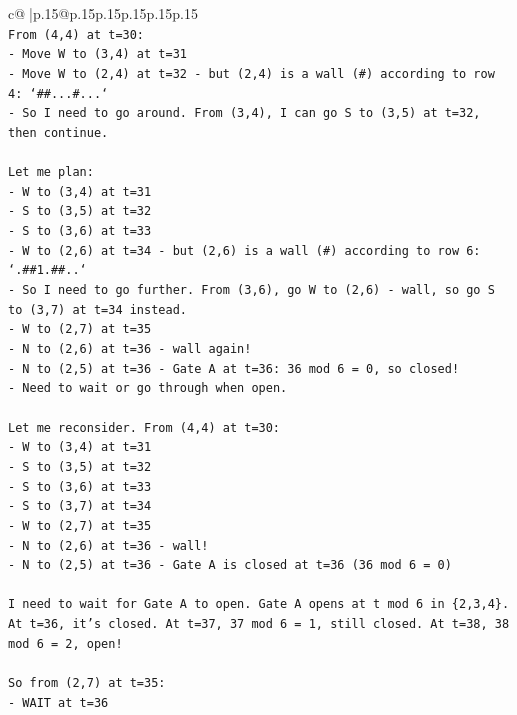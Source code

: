 \documentclass{article}
\begin{document}
{\begin{supertabular}{c@{$\;$}|p{.15\linewidth}@{}p{.15\linewidth}p{.15\linewidth}p{.15\linewidth}p{.15\linewidth}p{.15\linewidth}}
{{{\\ 
\texttt{From (4,4) at t=30:} \\
\texttt{{-} Move W to (3,4) at t=31} \\
\texttt{{-} Move W to (2,4) at t=32 {-} but (2,4) is a wall (\#) according to row 4: `\#\#...\#...`} \\
\texttt{{-} So I need to go around. From (3,4), I can go S to (3,5) at t=32, then continue.} \\
\\ 
\texttt{Let me plan:} \\
\texttt{{-} W to (3,4) at t=31} \\
\texttt{{-} S to (3,5) at t=32} \\
\texttt{{-} S to (3,6) at t=33} \\
\texttt{{-} W to (2,6) at t=34 {-} but (2,6) is a wall (\#) according to row 6: `.\#\#1.\#\#..`} \\
\texttt{{-} So I need to go further. From (3,6), go W to (2,6) {-} wall, so go S to (3,7) at t=34 instead.} \\
\texttt{{-} W to (2,7) at t=35} \\
\texttt{{-} N to (2,6) at t=36 {-} wall again!} \\
\texttt{{-} N to (2,5) at t=36 {-} Gate A at t=36: 36 mod 6 = 0, so closed!} \\
\texttt{{-} Need to wait or go through when open.} \\
\\ 
\texttt{Let me reconsider. From (4,4) at t=30:} \\
\texttt{{-} W to (3,4) at t=31} \\
\texttt{{-} S to (3,5) at t=32} \\
\texttt{{-} S to (3,6) at t=33} \\
\texttt{{-} S to (3,7) at t=34} \\
\texttt{{-} W to (2,7) at t=35} \\
\texttt{{-} N to (2,6) at t=36 {-} wall!} \\
\texttt{{-} N to (2,5) at t=36 {-} Gate A is closed at t=36 (36 mod 6 = 0)} \\
\\ 
\texttt{I need to wait for Gate A to open. Gate A opens at t mod 6 in \{2,3,4\}. At t=36, it's closed. At t=37, 37 mod 6 = 1, still closed. At t=38, 38 mod 6 = 2, open!} \\
\\ 
\texttt{So from (2,7) at t=35:} \\
\texttt{{-} WAIT at t=36} \\
}}}
\end{supertabular}}
\end{document}
